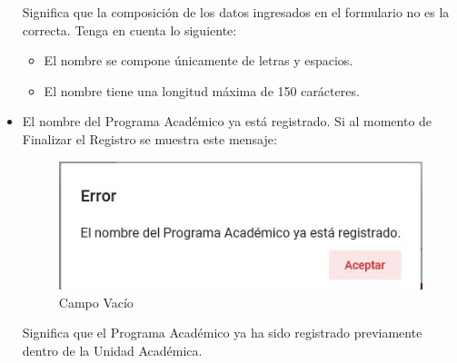 \begin{itemize}
                    Significa que la composición de los datos ingresados en el formulario no es la correcta. Tenga en cuenta lo siguiente:

                    \begin{itemize}
                        \item El nombre se compone únicamente de letras y espacios.

                        \item El nombre tiene una longitud máxima de 150 carácteres.
                    \end{itemize}

                \item El nombre del Programa Académico ya está registrado.
                    Si al momento de Finalizar el Registro se muestra este mensaje:

                     \begin{figure}[H]
                    \centering
                    \hypertarget{vacio}{\includegraphics[width=0.7\linewidth]{images/SP3/Yareg}}
                    \caption{Campo Vacío}
                    \label{vacio}
                    \end{figure}

                    Significa que el Programa Académico ya ha sido registrado previamente dentro de la Unidad Académica.
            \end{itemize}
